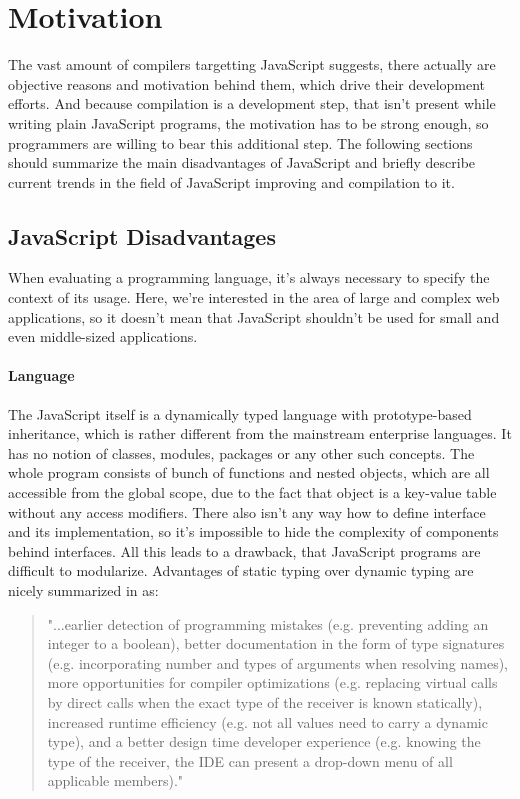 \documentclass[12pt,a4paper]{report}
\begin{document}
\section{Motivation}

The vast amount of compilers targetting JavaScript suggests, there actually are objective reasons and motivation behind them, which drive their development efforts. And because compilation is a development step, that isn't present while writing plain JavaScript programs, the motivation has to be strong enough, so programmers are willing to bear this additional step. The following sections should summarize the main disadvantages of JavaScript and briefly describe current trends in the field of JavaScript improving and compilation to it.

\subsection{JavaScript Disadvantages}

When evaluating a programming language, it's always necessary to specify the context of its usage. Here, we're interested in the area of large and complex web applications, so it doesn't mean that JavaScript shouldn't be used for small and even middle-sized applications.

\paragraph{Language} The JavaScript itself is a dynamically typed language with prototype-based inheritance, which is rather different from the mainstream enterprise languages. It has no notion of classes, modules, packages or any other such concepts. The whole program consists of bunch of functions and nested objects, which are all accessible from the global scope, due to the fact that object is a key-value table without any access modifiers. There also isn't any way how to define interface and its implementation, so it's impossible to hide the complexity of components behind interfaces. All this leads to a drawback, that JavaScript programs are difficult to modularize. Advantages of static typing over dynamic typing are nicely summarized in \cite{meijer} as: 

\begin{quote}
"...earlier detection of programming mistakes (e.g. preventing adding an integer to a boolean), better documentation in the form of type signatures (e.g. incorporating number and types of arguments when resolving names), more opportunities for compiler optimizations (e.g. replacing virtual calls by direct calls when the exact type of the receiver is known statically), increased runtime efficiency (e.g. not all values need to carry a dynamic type), and a better design time developer experience (e.g. knowing the type of the receiver, the IDE can present a drop-down menu of all applicable members)."
\end{quote}
\end{document}
